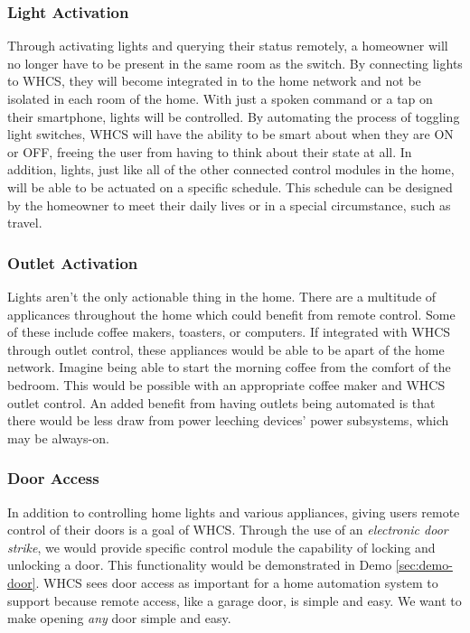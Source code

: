 \subsubsection{Light Activation}
Through activating lights and querying their status remotely, a homeowner will
no longer have to be present in the same room as the switch.  By connecting
lights to WHCS, they will become integrated in to the home network and not be
isolated in each room of the home.  With just a spoken command or a tap on
their smartphone, lights will be controlled.  By automating the process of
toggling light switches, WHCS will have the ability to be smart about when they
are ON or OFF, freeing the user from having to think about their state at all.
In addition, lights, just like all of the other connected control modules in
the home, will be able to be actuated on a specific schedule. This schedule
 can be designed by the homeowner
to meet their daily lives or in a special circumstance, such as travel.

\subsubsection{Outlet Activation}
Lights aren't the only actionable thing in the home. There are a multitude of
applicances throughout the home which could benefit from remote control. Some
of these include coffee makers, toasters, or computers. If integrated with WHCS through outlet control, these appliances
would be able to be apart of the home network. Imagine being able to start the
morning coffee from the comfort of the bedroom. This would be possible with an
appropriate coffee maker and WHCS outlet control. An added benefit from having
outlets being automated is that there would be less draw from power leeching
devices' power subsystems, which may be always-on. 

\subsubsection{Door Access}
In addition to controlling home lights and various appliances, giving users
remote control of their doors is  a goal of WHCS. Through the use of an
\emph{electronic door strike}, we would provide specific control module the
capability of locking and unlocking a door. This functionality would be
demonstrated in Demo \ref{sec:demo-door}. WHCS sees door access as important
for a home automation system to support because remote access, like a garage
door, is simple and easy. We want to make opening \emph{any} door simple and
easy.

